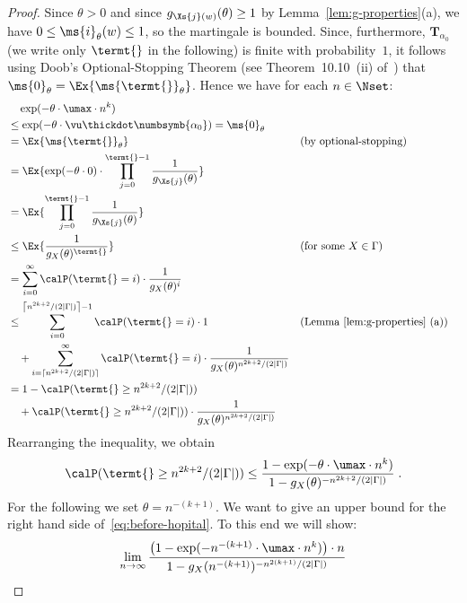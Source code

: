 \begin{proof}
Since $\theta > 0$ and since $g_{\Xs{j}(w)}(\theta) \ge 1$ by Lemma~\ref{lem:g-properties}(a),
 we have $0 \le \ms{i}_\theta(w) \le 1$, so the martingale is bounded.
Since, furthermore, $\mathbf{T}_{\alpha_0}$ (we write only $\termt{}$ in the following) is finite with probability~$1$,
 it follows using Doob's Optional-Stopping Theorem (see Theorem~10.10~(ii) of~\cite{book:Williams})
 that $\ms{0}_\theta = \Ex{\ms{\termt{}}_\theta}$.
Hence we have for each $n \in \Nset$:
\begin{align*}
 & \quad   \exp(-\theta \cdot \umax \cdot n^k) \\
 & \le \exp(-\theta \cdot \vu \thickdot \numbsymb{\alpha_0}) = \ms{0}_\theta \\ & = \Ex{\ms{\termt{}}_\theta} && \text{(by optional-stopping)} \\
 & = \Ex{\exp(-\theta \cdot 0) \cdot \prod_{j=0}^{\termt{}-1} \frac{1}{g_{\Xs{j}}(\theta)}} \\
 & = \Ex{\prod_{j=0}^{\termt{}-1} \frac{1}{g_{\Xs{j}}(\theta)}} \\
 & \le \Ex{\frac{1}{g_X(\theta)^\termt{}}} && \text{(for some $X \in \Gamma$)} \\
 & = \sum_{i=0}^\infty \calP(\termt{} = i) \cdot \frac{1}{g_X(\theta)^i} \\
 & \le \sum_{i=0}^{\left\lceil n^{2k+2} / (2 |\Gamma|) \right\rceil-1} \calP(\termt{} = i) \cdot 1  && \text{(Lemma~\ref{lem:g-properties}~(a))} \\
 & \quad + \sum_{i=\left\lceil n^{2k+2} / (2 |\Gamma|) \right\rceil}^\infty \calP(\termt{} = i) \cdot \frac{1}{g_X(\theta)^{ n^{2k+2} / (2 |\Gamma|) }} \\
 & = 1 - \calP(\termt{} \ge n^{2k+2}/(2 |\Gamma|)) \\
 & \quad \mbox{} + \calP(\termt{} \ge n^{2k+2}/(2 |\Gamma|)) \cdot \frac{1}{g_X(\theta)^{n^{2k+2}/(2 |\Gamma|)}}
\end{align*}
Rearranging the inequality, we obtain
\begin{equation}
 \calP(\termt{} \ge n^{2k+2}/(2 |\Gamma|)) \le \frac{1 - \exp(-\theta \cdot \umax \cdot n^{k})}{1 - g_X(\theta)^{-n^{2k+2}/(2 |\Gamma|)}} \;.
  \label{eq:before-hopital}
\end{equation}
For the following we set $\theta = n^{-(k+1)}$.
We want to give an upper bound for the right hand side of~\eqref{eq:before-hopital}.
To this end we will show:
 \begin{equation}
  \lim_{n\to\infty} \frac{\left(1 - \exp(-n^{-(k+1)} \cdot \umax \cdot n^{k})\right) \cdot n}{1 - g_X(n^{-(k+1)})^{-n^{2(k+1)}/ (2 |\Gamma|)}}

\end{equation}
\end{proof}
